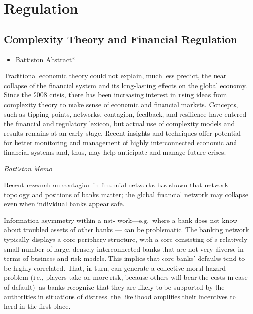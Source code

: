 \documentclass[
]{book}
\providecommand{\tightlist}{%
  \setlength{\itemsep}{0pt}\setlength{\parskip}{0pt}}
\begin{document}
\hypertarget{regulation}{%
\chapter{Regulation}\label{regulation}}

\hypertarget{complexity-theory-and-financial-regulation}{%
\section{Complexity Theory and Financial Regulation}\label{complexity-theory-and-financial-regulation}}

\begin{itemize}
\tightlist
\item
  Battiston Abstract*
\end{itemize}

Traditional economic theory could not explain, much less predict, the near collapse of the financial system and its long-lasting effects on the global economy. Since the 2008 crisis, there has been increasing interest in using ideas from complexity theory to make sense of economic and financial markets. Concepts, such as tipping points, networks, contagion, feedback, and resilience have entered the financial and regulatory lexicon, but actual use of complexity models and results remains at an early stage. Recent insights and techniques offer potential for better monitoring and management of highly interconnected economic and financial systems and, thus, may help anticipate and manage future crises.

\emph{Battiston Memo}

Recent research on contagion in
financial networks has shown that network
topology and positions of banks matter; the
global financial network may collapse even
when individual banks appear safe.

Information asymmetry within a net-
work---e.g.~where a bank does not know
about troubled assets of other banks --- can
be problematic. The banking network typically displays a core-periphery structure,
with a core consisting of a relatively small
number of large, densely interconnected
banks that are not very diverse in terms of
business and risk models. This implies that
core banks' defaults tend to be highly correlated.
That, in turn, can generate a collective moral hazard problem (i.e., players
take on more risk, because others will bear
the costs in case of default), as banks recognize
that they are likely to be supported by
the authorities in situations of distress, the
likelihood amplifies their incentives to herd
in the first place.
\end{document}
